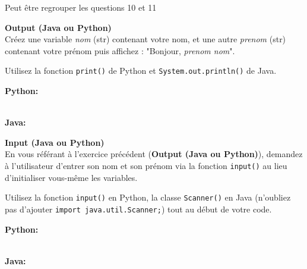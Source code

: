 Peut être regrouper les questions 10 et 11 
\begin{Exercice}[5 minutes] \textbf{Output (Java ou Python)}\\
   Créez une variable \textit{nom} (str) contenant votre nom, et une autre \textit{prenom} (str) contenant votre prénom puis affichez : "Bonjour, \textit{prenom nom}". \\
   
    \begin{conseil}
        Utilisez la fonction \lstinline{print()} de Python et \lstinline{System.out.println()} de Java. 
        
    \end{conseil}
    \begin{solution}
    
    \textbf{Python:} 
    
    
    \textbf{\\Java:} 
      
       
        
    \end{solution}   
\end{Exercice}

\begin{Exercice}[5 minutes] \textbf{Input (Java ou Python)}\\
   En vous référant à l'exercice précédent (\textbf{Output (Java ou Python)}), demandez à l'utilisateur d'entrer son nom et son prénom via la fonction \lstinline{input()} au lieu d'initialiser vous-même les variables. \\
   
    \begin{conseil}
       Utilisez la fonction \lstinline{input()} en Python, la classe \lstinline{Scanner()} en Java (n'oubliez pas d'ajouter \lstinline{import java.util.Scanner;}) tout au début de votre code. 
        
    \end{conseil}
    \begin{solution}
    
    \textbf{Python:} 
    
    
    \textbf{\\Java:}
      
       
        
    \end{solution}   
\end{Exercice}

